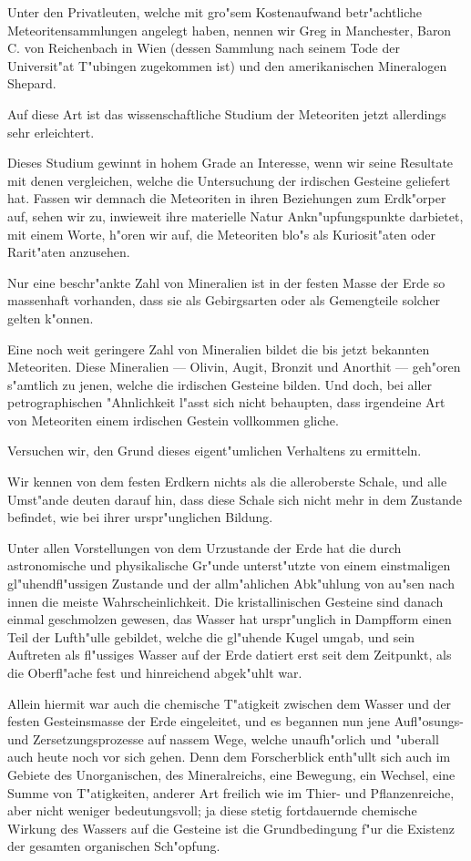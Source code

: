\documentclass[a4paper, 11pt, oneside, german]{article}
\begin{document}
Unter den Privatleuten, welche mit gro"sem Kostenaufwand betr"achtliche Meteoritensammlungen angelegt haben, nennen wir Greg in Manchester, Baron C. von Reichenbach in Wien (dessen Sammlung nach seinem Tode der Universit"at T"ubingen zugekommen ist) und den amerikanischen Mineralogen Shepard.

Auf diese Art ist das wissenschaftliche Studium der Meteoriten jetzt allerdings sehr erleichtert.

Dieses Studium gewinnt in hohem Grade an Interesse, wenn wir seine Resultate mit denen vergleichen, welche die Untersuchung der irdischen Gesteine geliefert hat. Fassen wir demnach die Meteoriten in ihren Beziehungen zum Erdk"orper auf, sehen wir zu, inwieweit ihre materielle Natur Ankn"upfungspunkte darbietet, mit einem Worte, h"oren wir auf, die Meteoriten blo"s als Kuriosit"aten oder Rarit"aten anzusehen.

Nur eine beschr"ankte Zahl von Mineralien ist in der festen Masse der Erde so massenhaft vorhanden, dass sie als Gebirgsarten oder als Gemengteile solcher gelten k"onnen.

Eine noch weit geringere Zahl von Mineralien bildet die bis jetzt bekannten Meteoriten. Diese Mineralien --- Olivin, Augit, Bronzit und Anorthit --- geh"oren s"amtlich zu jenen, welche die irdischen Gesteine bilden. Und doch, bei aller petrographischen "Ahnlichkeit l"asst sich nicht behaupten, dass irgendeine Art von Meteoriten einem irdischen Gestein vollkommen gliche.

Versuchen wir, den Grund dieses eigent"umlichen Verhaltens zu ermitteln.

Wir kennen von dem festen Erdkern nichts als die alleroberste Schale, und alle Umst"ande deuten darauf hin, dass diese Schale sich nicht mehr in dem Zustande befindet, wie bei ihrer urspr"unglichen Bildung.

Unter allen Vorstellungen von dem Urzustande der Erde hat die durch astronomische und physikalische Gr"unde unterst"utzte von einem einstmaligen gl"uhendfl"ussigen Zustande und der allm"ahlichen Abk"uhlung von au"sen nach innen die meiste Wahrscheinlichkeit. Die kristallinischen Gesteine sind danach einmal geschmolzen gewesen, das Wasser hat urspr"unglich in Dampfform einen Teil der Lufth"ulle gebildet, welche die gl"uhende Kugel umgab, und sein Auftreten als fl"ussiges Wasser auf der Erde datiert erst seit dem Zeitpunkt, als die Oberfl"ache fest und hinreichend abgek"uhlt war.

Allein hiermit war auch die chemische T"atigkeit zwischen dem Wasser und der festen Gesteinsmasse der Erde eingeleitet, und es begannen nun jene Aufl"osungs- und Zersetzungsprozesse auf nassem Wege, welche unaufh"orlich und "uberall auch heute noch vor sich gehen. Denn dem Forscherblick enth"ullt sich auch im Gebiete des Unorganischen, des Mineralreichs, eine Bewegung, ein Wechsel, eine Summe von T"atigkeiten, anderer Art freilich wie im Thier- und Pflanzenreiche, aber nicht weniger bedeutungsvoll; ja diese stetig fortdauernde chemische Wirkung des Wassers auf die Gesteine ist die Grundbedingung f"ur die Existenz der gesamten organischen Sch"opfung.
\end{document}
